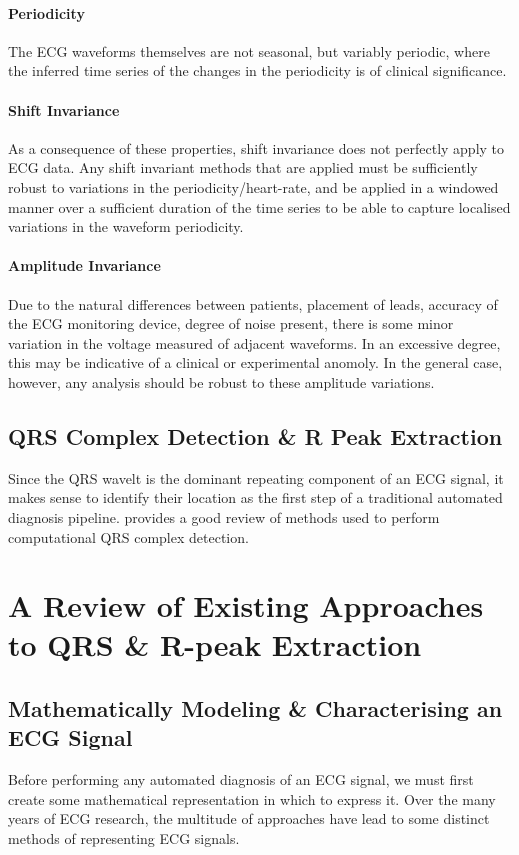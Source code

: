 \documentclass[9pt,conference]{IEEEtran}
\begin{document}
\paragraph{Periodicity}
The ECG waveforms themselves are not seasonal, but variably periodic, where the inferred time series of the changes in the periodicity is of clinical significance.


\paragraph{Shift Invariance}
As a consequence of these properties, shift invariance does not perfectly apply to ECG data. Any shift invariant methods that are applied must be sufficiently robust to variations in the periodicity/heart-rate, and be applied in a windowed manner over a sufficient duration of the time series to be able to capture localised variations in the waveform periodicity.

\paragraph{Amplitude Invariance}
Due to the natural differences between patients, placement of leads, accuracy of the ECG monitoring device, degree of noise present, there is some minor variation in the voltage measured of adjacent waveforms. In an excessive degree, this may be indicative of a clinical or experimental anomoly. In the general case, however, any analysis should be robust to these amplitude variations.


\subsection{QRS Complex Detection \& R Peak Extraction}

Since the QRS wavelt is the dominant repeating component of an ECG signal, it makes sense to identify their location as the first step of a traditional automated diagnosis pipeline. \cite{ecgReview} provides a good review of methods used to perform computational QRS complex detection.

\section{A Review of Existing Approaches to QRS \& R-peak Extraction}

\subsection{Mathematically Modeling \& Characterising an ECG Signal}
Before performing any automated diagnosis of an ECG signal, we must first create some mathematical representation in which to express it. Over the many years of ECG research, the multitude of approaches have lead to some distinct methods of representing ECG signals.
\end{document}
